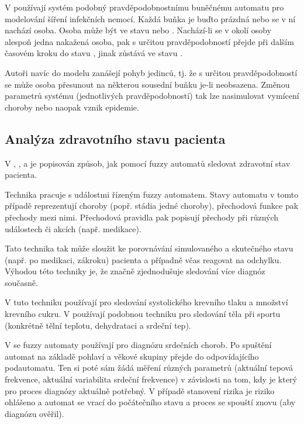 \documentclass[a4paper,10pt]{article}
\begin{document}
V \cite{BocChe-CriBePrAuNetModSprInfDis+} používají systém podobný pravděpodobnostnímu buněčnému automatu pro modelování šíření infekčních nemocí. Každá buňka je buďto prázdná nebo se v ní nachází osoba. Osoba může být ve stavu  nebo . Nachází-li se v okolí  osoby alespoň jedna nakažená osoba, pak s určitou pravděpodobností přejde při dalším časovém kroku do stavu , jinak zůstává ve stavu . 

Autoři navíc do modelu zanášejí pohyb jedinců, tj. že s určitou pravděpodobností se může osoba přesunout na některou sousední buňku je-li neobsazena. Změnou parametrů systému (jednotlivých pravděpodobností) tak lze nasimulovat vymícení choroby nebo naopak vznik epidemie.

\subsection{Analýza zdravotního stavu pacienta}
V \cite{Jia+-ExHeaSimMetBasIntHumTheMod}, \cite{GupRah-CliMonUsFuzSys}, \cite{CamMerNun-UsFuzAutDiagPrHeaPro} a \cite{SteAdl-CliMonFuzAut} je popisován způsob, jak pomocí fuzzy automatů sledovat zdravotní stav pacienta. 


Technika pracuje s událostmi řízeným fuzzy automatem. Stavy automatu v tomto případě reprezentují choroby (popř. stádia jedné choroby), přechodová funkce pak přechody mezi nimi. Přechodová pravidla pak popisují přechody při různých událostech či akcích (např. medikace). 

Tato technika tak může sloužit ke porovnávání simulovaného a skutečného stavu (např. po medikaci, zákroku) pacienta a případně včas reagovat na odchylku. Výhodou této techniky je, že značně zjednodušuje sledování více diagnóz současně.

V \cite{GupRah-CliMonUsFuzSys} tuto techniku používají pro sledování systolického krevního tlaku a množství krevního cukru. V \cite{Jia+-ExHeaSimMetBasIntHumTheMod} používají podobnou techniku pro sledování těla při sportu (konkrétně tělní teplotu, dehydrataci a srdeční tep).

V \cite{CamMerNun-UsFuzAutDiagPrHeaPro} se fuzzy automaty používají pro diagnózu srdečních chorob. Po spuštění automat na základě pohlaví a věkové skupiny přejde do odpovídajícího podautomatu. Ten si poté sám žádá měření různých parametrů (aktuální tepová frekvence, aktuální variabilita srdeční frekvence) v závislosti na tom, kdy je který pro proces diagnózy aktuálně potřebný. V případě stanovení rizika je riziko ohlášeno a automat se vrací do počátečního stavu a proces se spouští znovu (aby diagnózu ověřil). 
\end{document}
